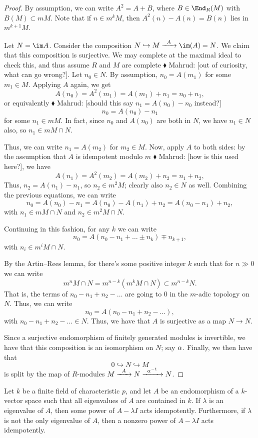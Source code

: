 \documentclass{article}
\let\l\lambda
\let\inc\hookrightarrow
\numberwithin{equation}{section}
\theoremstyle{theorem}
\numberwithin{thm}{section}
\theoremstyle{definition}
\newcommand{\mahrud}[1]{{\color{ForestGreen} \sf $\blacklozenge$ Mahrud: [#1]}}
\begin{document}
\begin{proof}
  By assumption, we can write $A^2 = A + B$, where $B\in\End_R(M)$ with $B(M)\subset mM$.
Note that if $n \in m^kM$, then $A^2(n) - A(n) = B(n)$  lies in $m^{k+1}M$.

Let $N = \im A$. Consider the composition $N\inc M \xra{A} \im(A) = N$. We claim that this composition is surjective. We may complete at the maximal ideal to check this, and thus assume $R$ and $M$ are complete\mahrud{out of curiosity, what can go wrong?}. Let $n_0\in N$. By assumption, $n_0=A(m_1)$ for some $m_1\in M$. Applying $A$ again, we get 
\[ A(n_0) = A^2(m_1) = A(m_1) + n_1 = n_0 + n_1, \]
or equivalently \mahrud{should this say $n_1 = A(n_0) - n_0$ instead?}
\[ n_0 = A(n_0) - n_1 \]
for some $n_1\in mM$. In fact, since $n_0$ and $A(n_0)$ are both in $N$, we have $n_1\in N$ also, so $n_1\in mM\cap N$.

Thus, we can write $n_1 = A(m_2)$ for $m_2\in M$.
Now, apply $A$ to both sides: by the assumption that $A$ is idempotent modulo $m$\mahrud{how is this used here?}, we have
\[ A(n_1)=A^2(m_2) = A(m_2) + n_2 = n_1+n_2, \]
Thus, $n_2=A(n_1)-n_1$, so $n_2\in m^2M$; clearly also $n_2\in N$ as well. 
Combining the previous equations, we can write
\[ n_0 = A(n_0) - n_1 = A(n_0) - A(n_1) + n_2 = A(n_0 - n_1) + n_2, \]
with $n_1\in mM\cap N$ and $n_2\in m^2M\cap N$.

Continuing in this fashion, for any $k$ we can write 
\[ n_0=A(n_0-n_1+\dots \pm n_k) \mp n_{k+1}, \]
with $n_i \in m^i M\cap N$.

By the Artin--Rees lemma, for there's some positive integer $k$ such that for $n\gg0$ we can write
\[ m^n M\cap N = m^{n-k} ( m^kM\cap N)\subset m^{n-k} N. \]
That is, the terms of $n_0-n_1+n_2-\dots$ are going to 0 in the $m$-adic topology on $N$. Thus, we can write
\[ n_0=A(n_0-n_1+n_2-\dots), \]
with $n_0-n_1+n_2-\dots\in N$. Thus, we have that $A$ is surjective as a map $N\to N$.

Since a surjective endomorphism of finitely generated modules is invertible, we have that this composition is an isomorphism on $N$; say $\alpha$.
Finally, we then have that
\[ 0 \inc N \inc M \]
is split by the map of $R$-modules $M\xra A N\xra{\a\inv} N$. 
\end{proof}

\begin{lem}
Let $k$ be a finite field of characteristic $p$, and let $A$ be an endomorphism of a $k$-vector space such that all eigenvalues of $A$ are contained in $k$. If $\l$ is an eigenvalue of $A$, then some power of $A-\l I$ acts idempotently.
Furthermore, if $\l$ is not the only eigenvalue of $A$, then a nonzero power of $A-\l I$ acts idempotently.
\end{lem}
\end{document}

